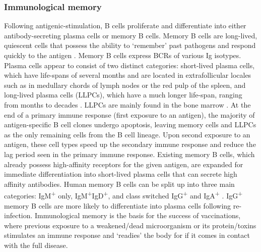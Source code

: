 \subsubsection{Immunological memory}
Following antigenic-stimulation, B cells proliferate and differentiate into either antibody-secreting plasma cells or memory B cells.
Memory B cells are long-lived, quiescent cells that possess the ability to `remember' past pathogens and respond quickly to the antigen \cite{palm2019remembrance}.
Memory B cells express BCRs of various Ig isotypes.
Plasma cells appear to consist of two distinct categories: short-lived plasma cells, which have life-spans of several months and are located in extrafollicular locales such as in medullary chords of lymph nodes or the red pulp of the spleen, and long-lived plasma cells (LLPCs), which have a much longer life-span, ranging from months to decades \cite{bortnick2013and, andraud2012living}.
LLPCs are mainly found in the bone marrow \cite{bortnick2013and, andraud2012living}.
At the end of a primary immune response (first exposure to an antigen), the majority of antigen-specific B cell clones undergo apoptosis, leaving memory cells and LLPCs as the only remaining cells from the B cell lineage.
Upon second exposure to an antigen, these cell types speed up the secondary immune response and reduce the lag period seen in the primary immune response.
Existing memory B cells, which already possess high-affinity receptors for the given antigen, are expanded for immediate differentiation into short-lived plasma cells that can secrete high affinity antibodies.
Human memory B cells can be split up into three main categories: IgM\textsuperscript{+} only, IgM\textsuperscript{+}IgD\textsuperscript{+}, and class switched IgG\textsuperscript{+} and IgA\textsuperscript{+} \cite{palm2019remembrance}.
IgG\textsuperscript{+} memory B cells are more likely to differentiate into plasma cells following re-infection.
Immunological memory is the basis for the success of vaccinations, where previous exposure to a weakened/dead microorganism or its protein/toxins stimulates an immune response and `readies' the body for if it comes in contact with the full disease.

